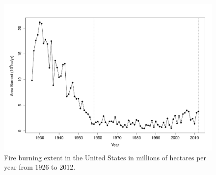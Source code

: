 \begin{figure}
\begin{centering}
\includegraphics[width=1\textwidth]{chapter1/figures-appendix/fire.pdf}
\par\end{centering}
\caption{\label{fig:Fire-burning-extent}Fire burning extent in the United
States in millions of hectares per year from 1926 to 2012.}
\end{figure}

\renewcommand{\tablename}{Table}
\renewcommand{\thetable}{\arabic{table}}
\renewcommand{\figurename}{Figure}
\renewcommand{\thefigure}{\arabic{figure}}
\clearpage
